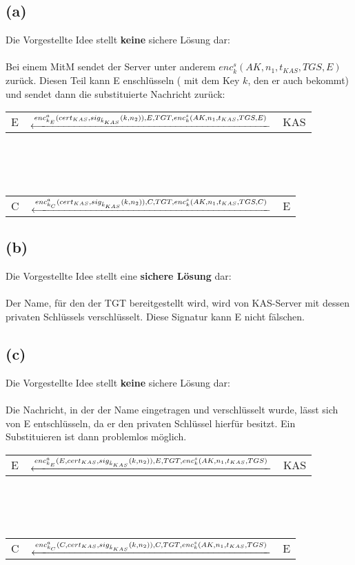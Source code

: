 \documentclass[12pt,pdftex,a4paper]{article}
\begin{document}
\subsection*{(a)}
Die Vorgestellte Idee stellt \textbf{keine} sichere Lösung dar: \\\\
Bei einem MitM sendet der Server unter anderem $enc_{k}^{s}(AK, n_{1}, t_{KAS}, TGS, E)$ zurück. Diesen Teil kann E enschlüsseln ( mit dem Key $k$, den er auch bekommt) und sendet dann die substituierte Nachricht zurück:\\
\begin{tabular}{|c|c|c|}
E & 
$\xlongleftarrow{enc_{k_{E}}^{a}(cert_{KAS}, sig_{\hat{k}_{KAS}}(k,n_{2})), E , TGT, enc_{k}^{s}(AK, n_{1}, t_{KAS}, TGS, E) } $
 & KAS 
\end{tabular} 
\\\\\\
\begin{tabular}{|c|c|c|}
C & 

$\xlongleftarrow{enc_{k_{C}}^{a}(cert_{KAS}, sig_{\hat{k}_{KAS}}(k,n_{2})), C , TGT, enc_{k}^{s}(AK, n_{1}, t_{KAS}, TGS, C) } $ & E 
\end{tabular} 

\subsection*{(b)}
Die Vorgestellte Idee stellt eine \textbf{sichere Lösung} dar: \\\\
Der Name, für den der TGT bereitgestellt wird, wird von KAS-Server mit dessen privaten Schlüssels verschlüsselt. Diese Signatur kann E nicht fälschen.
\subsection*{(c)}
Die Vorgestellte Idee stellt \textbf{keine} sichere Lösung dar: \\\\
Die Nachricht, in der der Name eingetragen und verschlüsselt wurde, lässt sich von E entschlüsseln, da er den privaten Schlüssel hierfür besitzt. Ein Substituieren ist dann problemlos möglich.\\
\begin{tabular}{|c|c|c|}
E & 
$\xlongleftarrow{enc_{k_{E}}^{a}(E, cert_{KAS}, sig_{\hat{k}_{KAS}}(k,n_{2})), E , TGT, enc_{k}^{s}(AK, n_{1}, t_{KAS}, TGS) } $
 & KAS 
\end{tabular} 
\\\\\\
\begin{tabular}{|c|c|c|}
C & 

$\xlongleftarrow{enc_{k_{C}}^{a}(C, cert_{KAS}, sig_{\hat{k}_{KAS}}(k,n_{2})), C , TGT, enc_{k}^{s}(AK, n_{1}, t_{KAS}, TGS) } $ & E 
\end{tabular} 
\end{document}
